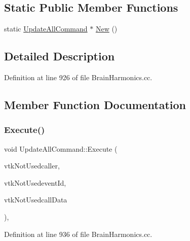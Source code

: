 \subsection*{Static Public Member Functions}
\begin{DoxyCompactItemize}
\item 
static \hyperlink{class_update_all_command}{Update\+All\+Command} $\ast$ \hyperlink{class_update_all_command_a97cd6ef1c68bb473aef27c898b175517}{New} ()
\end{DoxyCompactItemize}


\subsection{Detailed Description}


Definition at line 926 of file Brain\+Harmonics.\+cc.



\subsection{Member Function Documentation}
\mbox{\label{class_update_all_command_aa836cd5d538016289656d8118da879c5}} 
\subsubsection{\texorpdfstring{Execute()}{Execute()}}
{\footnotesize\ttfamily void Update\+All\+Command\+::\+Execute (\begin{DoxyParamCaption}\item[{vtk\+Object $\ast$}]{vtk\+Not\+Usedcaller,  }\item[{unsigned long }]{vtk\+Not\+Usedevent\+Id,  }\item[{void $\ast$}]{vtk\+Not\+Usedcall\+Data }\end{DoxyParamCaption})\hspace{0.3cm}{\ttfamily [inline]}, {\ttfamily [override]}}



Definition at line 936 of file Brain\+Harmonics.\+cc.

